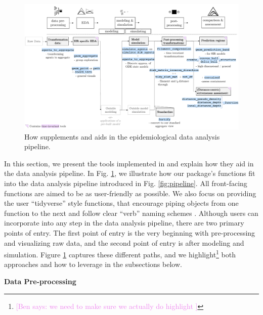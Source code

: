 \documentclass[
  shortnames]{jss}
\begin{document}
\afterpage{\clearpage}
\begin{figure}
    \centering
    \includegraphics[width = 1\textwidth]{images/pipeline2_1.pdf}
    \caption{How  supplements and aids in the epidemiological data analysis pipeline.}
    \label{fig:pipeline2}
\end{figure}

In this section, we present the tools implemented in 
and explain how they aid in the data analysis pipeline. In Fig.
\ref{fig:pipeline2}, we illustrate how our package's functions fit into
the data analysis pipeline introduced in Fig. \ref{fig:pipeline}. All
front-facing functions are aimed to be as user-friendly as possible. We
also focus on providing the user ``tidyverse'' style functions, that
encourage piping objects from one function to the next and follow clear
``verb'' naming schemes \citep{Wickham2019}. Although users can
incorporate  into any step in the data analysis
pipeline, there are two primary points of entry. The first point of
entry is the very beginning with pre-processing and visualizing raw
data, and the second point of entry is after modeling and simulation.
Figure \ref{fig:pipeline2} captures these different paths, and we
highlight\footnote{\textcolor{violet}{[Ben says: we need to make sure we actually do highlight ]}}
both approaches and how to leverage  in the subsections
below.

\textbf{Data Pre-processing}
\end{document}
